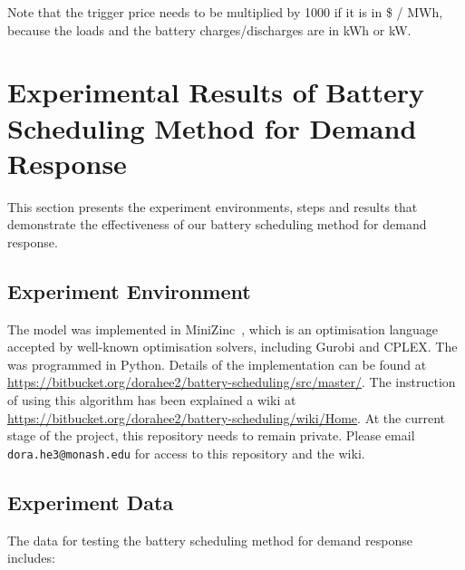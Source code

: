 Note that the trigger price needs to be multiplied by 1000 if it is in \$ / MWh, because the loads and the battery charges/discharges are in kWh or kW. 


\section{Experimental Results of Battery Scheduling Method for Demand Response}

This section presents the experiment environments, steps and results that demonstrate the effectiveness of our battery scheduling method for demand response. 

\subsection{Experiment Environment}

The  model was implemented in MiniZinc~\cite{Stuckey2018}, which is an optimisation language accepted by well-known optimisation solvers, including Gurobi and CPLEX. The  was programmed in Python. Details of the implementation can be found at \url{https://bitbucket.org/dorahee2/battery-scheduling/src/master/}. The instruction of using this algorithm has been explained a wiki at \url{https://bitbucket.org/dorahee2/battery-scheduling/wiki/Home}. 
At the current stage of the project, this repository needs to remain private. Please email \texttt{dora.he3@monash.edu} for access to this repository and the wiki.

\subsection{Experiment Data}

The data for testing the battery scheduling method for demand response includes:

